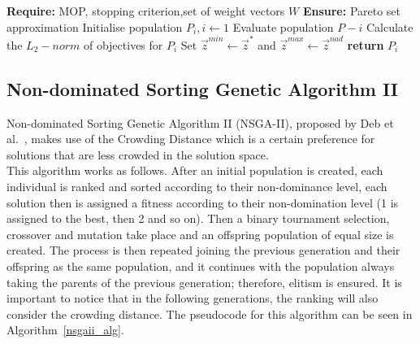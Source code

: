 \begin{algorithm}[H]
\label{mombi2_alg}
\caption{MOMBI2}
\SetAlgoLined
\textbf{Require:} MOP, stopping criterion,set of weight vectors $W$\;
\textbf{Ensure:} Pareto set approximation\;
Initialise population $P_i,i \gets 1$\;
Evaluate population $P-i$\;
Calculate the $L_2-norm$ of objectives for $P_i$\;
Set $\vec z^{min} \gets \vec z^*$ and $\vec z^{max} \gets \vec z^{nad}$\;
\textbf{return} $P_i$
\end{algorithm}


\subsection{Non-dominated Sorting Genetic Algorithm II}

Non-dominated Sorting Genetic Algorithm II (NSGA-II), proposed by Deb et al.~\cite{deb2002fast}, makes use of the Crowding Distance which is a certain preference for solutions that are less crowded in the solution space.\\

This algorithm works as follows. After an initial population is created, each individual is ranked and sorted according to their non-dominance level, each solution then is assigned a fitness according to their non-domination level (1 is assigned to the best, then 2 and so on). Then a binary tournament selection, crossover and mutation take place and an offspring population of equal size is created. The process is then repeated joining the previous generation and their offspring as the same population, and it continues with the population always taking the parents of the previous generation; therefore, elitism is ensured. It is important to notice that in the following generations, the ranking will also consider the crowding distance. The pseudocode for this algorithm can be seen in Algorithm~\ref{nsgaii_alg}.

